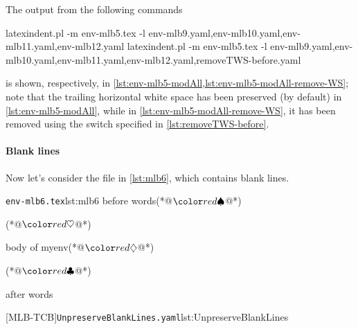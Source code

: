 The output from the following commands 
\begin{sidebyside}
\begin{commandshell}
latexindent.pl -m env-mlb5.tex -l env-mlb9.yaml,env-mlb10.yaml,env-mlb11.yaml,env-mlb12.yaml
latexindent.pl -m env-mlb5.tex -l env-mlb9.yaml,env-mlb10.yaml,env-mlb11.yaml,env-mlb12.yaml,removeTWS-before.yaml
\end{commandshell}
\end{sidebyside}
is shown, respectively, in \cref{lst:env-mlb5-modAll,lst:env-mlb5-modAll-remove-WS}; note that 
the trailing horizontal white space has been preserved (by default) in \cref{lst:env-mlb5-modAll}, while 
in \cref{lst:env-mlb5-modAll-remove-WS}, it has been removed using the switch specified in \cref{lst:removeTWS-before}.



\paragraph{Blank lines}
Now let's consider the file in \cref{lst:mlb6}, which contains blank lines.

\begin{minipage}{.45\linewidth}
\begin{cmhlistings}[escapeinside={(*@}{@*)}]{\texttt{env-mlb6.tex}}{lst:mlb6}
before words(*@$\BeginStartsOnOwnLine$@*)


\begin{myenv}(*@$\BodyStartsOnOwnLine$@*)


body of myenv(*@$\EndStartsOnOwnLine$@*)


\end{myenv}(*@$\EndFinishesWithLineBreak$@*)

after words
\end{cmhlistings}
\end{minipage}%
\hfill
\begin{minipage}{.45\linewidth}
[MLB-TCB]{\texttt{UnpreserveBlankLines.yaml}}{lst:UnpreserveBlankLines}
\end{minipage}

